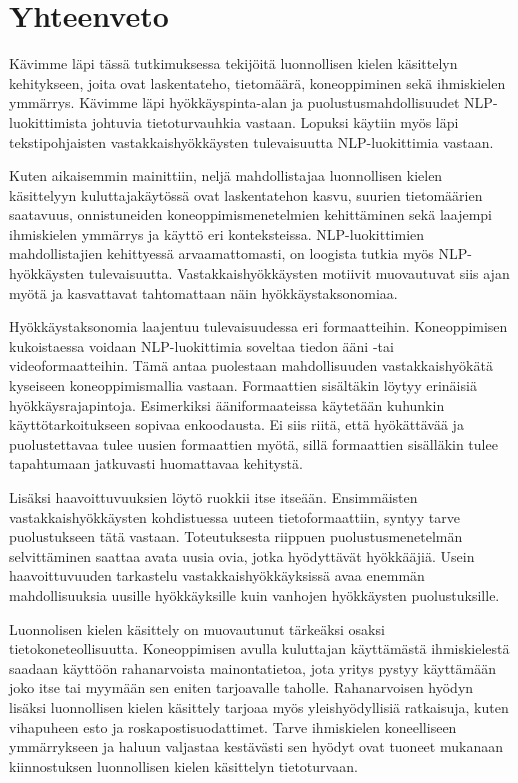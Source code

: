 \chapter{Yhteenveto\label{conclusions}}

Kävimme läpi tässä tutkimuksessa tekijöitä luonnollisen kielen käsittelyn kehitykseen, joita ovat laskentateho, tietomäärä, koneoppiminen sekä ihmiskielen ymmärrys. Kävimme läpi hyökkäyspinta-alan ja puolustusmahdollisuudet NLP-luokittimista johtuvia tietoturvauhkia vastaan. Lopuksi käytiin myös läpi tekstipohjaisten vastakkaishyökkäysten tulevaisuutta NLP-luokittimia vastaan.

Kuten aikaisemmin mainittiin, neljä mahdollistajaa luonnollisen kielen käsittelyyn kuluttajakäytössä ovat laskentatehon kasvu, suurien tietomäärien saatavuus, onnistuneiden koneoppimismenetelmien kehittäminen sekä laajempi ihmiskielen ymmärrys ja käyttö eri konteksteissa. NLP-luokittimien mahdollistajien kehittyessä arvaamattomasti, on loogista tutkia myös NLP-hyökkäysten tulevaisuutta. Vastakkaishyökkäysten motiivit muovautuvat siis ajan myötä ja kasvattavat tahtomattaan näin hyökkäystaksonomiaa. 

Hyökkäystaksonomia laajentuu tulevaisuudessa eri formaatteihin. Koneoppimisen kukoistaessa voidaan NLP-luokittimia soveltaa tiedon ääni -tai videoformaatteihin. Tämä antaa puolestaan mahdollisuuden vastakkaishyökätä kyseiseen koneoppimismallia vastaan. Formaattien sisältäkin löytyy erinäisiä hyökkäysrajapintoja. Esimerkiksi ääniformaateissa käytetään kuhunkin käyttötarkoitukseen sopivaa enkoodausta. Ei siis riitä, että hyökättävää ja puolustettavaa tulee uusien formaattien myötä, sillä formaattien sisälläkin tulee tapahtumaan jatkuvasti huomattavaa kehitystä.

Lisäksi haavoittuvuuksien löytö ruokkii itse itseään. Ensimmäisten vastakkaishyökkäysten kohdistuessa uuteen tietoformaattiin, syntyy tarve puolustukseen tätä vastaan. Toteutuksesta riippuen puolustusmenetelmän selvittäminen saattaa avata uusia ovia, jotka hyödyttävät hyökkääjiä. Usein haavoittuvuuden tarkastelu vastakkaishyökkäyksissä avaa enemmän mahdollisuuksia uusille hyökkäyksille kuin vanhojen hyökkäysten puolustuksille.

Luonnolisen kielen käsittely on muovautunut tärkeäksi osaksi tietokoneteollisuutta. Koneoppimisen avulla kuluttajan käyttämästä ihmiskielestä saadaan käyttöön rahanarvoista mainontatietoa, jota yritys pystyy käyttämään joko itse tai myymään sen eniten tarjoavalle taholle. Rahanarvoisen hyödyn lisäksi luonnollisen kielen käsittely tarjoaa myös yleishyödyllisiä ratkaisuja, kuten vihapuheen esto ja roskapostisuodattimet. Tarve ihmiskielen koneelliseen ymmärrykseen ja haluun valjastaa kestävästi sen hyödyt ovat tuoneet mukanaan kiinnostuksen luonnollisen kielen käsittelyn tietoturvaan.
